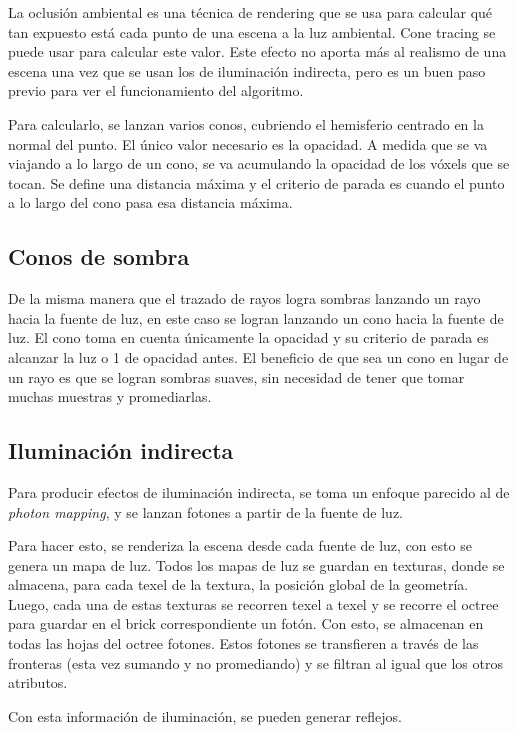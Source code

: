 La oclusión ambiental es una técnica de rendering que se usa para calcular qué tan expuesto está cada punto de una escena a la luz ambiental.
Cone tracing se puede usar para calcular este valor.
Este efecto no aporta más al realismo de una escena una vez que se usan los de iluminación indirecta, pero es un buen paso previo para ver el funcionamiento del algoritmo.

Para calcularlo, se lanzan varios conos, cubriendo el hemisferio centrado en la normal del punto.
El único valor necesario es la opacidad.
A medida que se va viajando a lo largo de un cono, se va acumulando la opacidad de los vóxels que se tocan.
Se define una distancia máxima y el criterio de parada es cuando el punto a lo largo del cono pasa esa distancia máxima.

\subsection{Conos de sombra}

De la misma manera que el trazado de rayos logra sombras lanzando un rayo hacia la fuente de luz, en este caso se logran lanzando un cono hacia la fuente de luz.
El cono toma en cuenta únicamente la opacidad y su criterio de parada es alcanzar la luz o 1 de opacidad antes.
El beneficio de que sea un cono en lugar de un rayo es que se logran sombras suaves, sin necesidad de tener que tomar muchas muestras y promediarlas.

\subsection{Iluminación indirecta}

Para producir efectos de iluminación indirecta, se toma un enfoque parecido al de \textit{photon mapping}, y se lanzan fotones a partir de la fuente de luz.

Para hacer esto, se renderiza la escena desde cada fuente de luz, con esto se genera un mapa de luz.
Todos los mapas de luz se guardan en texturas, donde se almacena, para cada texel de la textura, la posición global de la geometría.
Luego, cada una de estas texturas se recorren texel a texel y se recorre el octree para guardar en el brick correspondiente un fotón.
Con esto, se almacenan en todas las hojas del octree fotones.
Estos fotones se transfieren a través de las fronteras (esta vez sumando y no promediando) y se filtran al igual que los otros atributos.

Con esta información de iluminación, se pueden generar reflejos.

